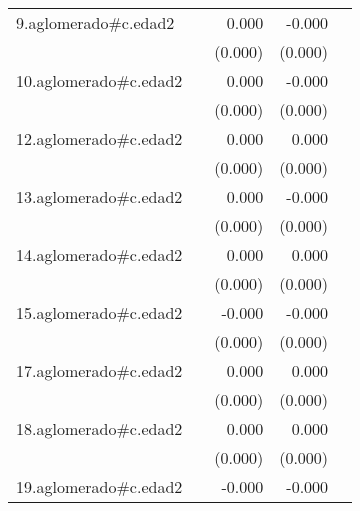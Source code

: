 {\begin{longtable}{l*{4}{D{.}{.}{-1}}}
\addlinespace
9.aglomerado#c.edad2&                     &       0.000         &      -0.000         &                     \\
            &                     &     (0.000)         &     (0.000)         &                     \\
\addlinespace
10.aglomerado#c.edad2&                     &       0.000         &      -0.000         &                     \\
            &                     &     (0.000)         &     (0.000)         &                     \\
\addlinespace
12.aglomerado#c.edad2&                     &       0.000         &       0.000         &                     \\
            &                     &     (0.000)         &     (0.000)         &                     \\
\addlinespace
13.aglomerado#c.edad2&                     &       0.000         &      -0.000         &                     \\
            &                     &     (0.000)         &     (0.000)         &                     \\
\addlinespace
14.aglomerado#c.edad2&                     &       0.000         &       0.000         &                     \\
            &                     &     (0.000)         &     (0.000)         &                     \\
\addlinespace
15.aglomerado#c.edad2&                     &      -0.000         &      -0.000\sym{*}  &                     \\
            &                     &     (0.000)         &     (0.000)         &                     \\
\addlinespace
17.aglomerado#c.edad2&                     &       0.000         &       0.000         &                     \\
            &                     &     (0.000)         &     (0.000)         &                     \\
\addlinespace
18.aglomerado#c.edad2&                     &       0.000         &       0.000         &                     \\
            &                     &     (0.000)         &     (0.000)         &                     \\
\addlinespace
19.aglomerado#c.edad2&                     &      -0.000         &      -0.000         &                     \\

\end{longtable}}
